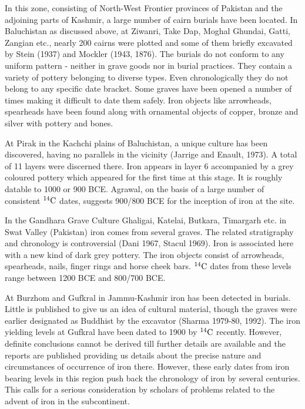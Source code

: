 \vspace{-.2cm}

In this zone, consisting of North-West Frontier provinces of Pakistan and the adjoining parts of Kashmir, a large number of cairn burials have been located. In Baluchistan as discussed above, at Ziwanri, Take Dap, Moghal Ghundai, Gatti, Zangian etc., nearly 200 cairns were plotted and some of them briefly excavated by Stein (1937) and Mockler (1943, 1876). The burials do not conform to any uniform pattern - neither in grave goods nor in burial practices. They contain a variety of pottery belonging to diverse types. Even chronologically they do not belong to any specific date bracket. Some graves have been opened a number of times making it difficult to date them safely. Iron objects like arrowheads, spearheads have been found along with ornamental objects of copper, bronze and silver with pottery and bones.

At Pirak in the Kachchi plains of Baluchistan, a unique culture has been discovered, having no parallels in the vicinity (Jarrige and Enault, 1973). A total of 11 layers were discerned there. Iron appears in layer 6 accompanied by a grey coloured pottery which appeared for the first time at this stage. It is roughly datable to 1000 or 900 BCE. Agrawal, on the basis of a large number of consistent $^{14}{\rm C}$ dates, suggests 900/800 BCE for the inception of iron at the site.

In the Gandhara Grave Culture Ghaligai, Katelai, Butkara, Timargarh etc. in Swat Valley (Pakistan) iron comes from several graves. The related stratigraphy and chronology is controversial (Dani 1967, Stacul 1969). Iron is associated here with a new kind of dark grey pottery. The iron objects consist of arrowheads, spearheads, nails, finger rings and horse cheek bars. $^{14}{\rm C}$ dates from these levels range between 1200 BCE and 800/700 BCE.

At Burzhom and Gufkral in Jammu-Kashmir iron has been detected in burials. Little is published to give us an idea of cultural material, though the graves were earlier designated as Buddhist by the excavator (Sharma 1979-80, 1992). The iron yielding levels at Gufkral have been dated to 1900 by $^{14}{\rm C}$ recently. However, definite conclusions cannot be derived till further details are available and the reports are published providing us details about the precise nature and circumstances of occurrence of iron there. However, these early dates from iron bearing levels in this region push back the chronology of iron by several centuries. This calls for a serious consideration by scholars of problems related to the advent of iron in the subcontinent.

